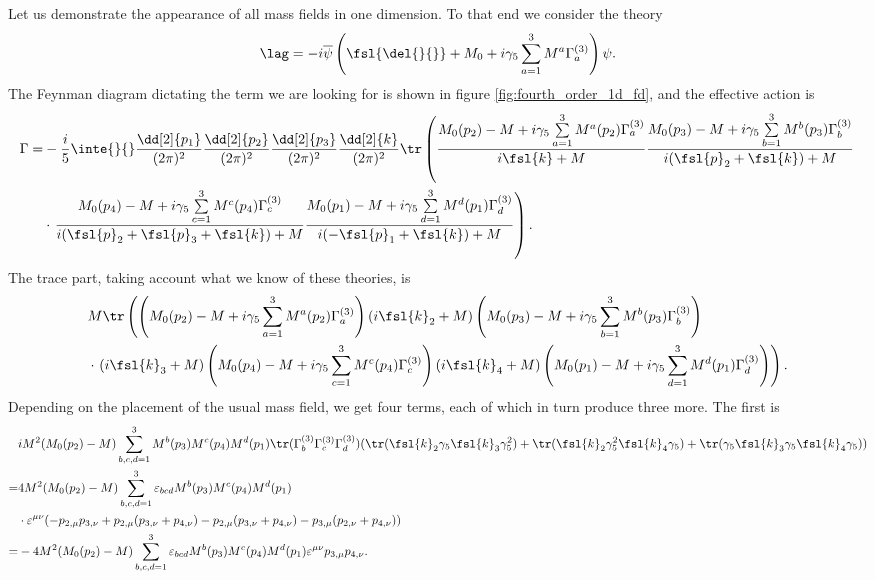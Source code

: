 Let us demonstrate the appearance of all mass fields in one dimension. To that end we consider the theory
\begin{align*}
	\lag = -i\overline{\psi}\left(\fsl{\del{}{}} + M_{0} + i\gamma_{5}\sum\limits_{a = 1}^{3}M^{a}\Gamma_{a}^{(3)}\right)\psi.
\end{align*}
The Feynman diagram dictating the term we are looking for is shown in figure \ref{fig:fourth_order_1d_fd}, and the effective action is
\begin{align*}
	\Gamma =& -\frac{i}{5}\inte{}{}\frac{\dd[2]{p_{1}}}{(2\pi)^{2}}\frac{\dd[2]{p_{2}}}{(2\pi)^{2}}\frac{\dd[2]{p_{3}}}{(2\pi)^{2}}\frac{\dd[2]{k}}{(2\pi)^{2}}\tr\left(\frac{M_{0}(p_{2}) - M + i\gamma_{5}\sum\limits_{a = 1}^{3}M^{a}(p_{2})\Gamma_{a}^{(3)}}{i\fsl{k} + M}\frac{M_{0}(p_{3}) - M + i\gamma_{5}\sum\limits_{b = 1}^{3}M^{b}(p_{3})\Gamma_{b}^{(3)}}{i(\fsl{p}_{2} + \fsl{k}) + M} \right. \\
	        &\cdot \left. \frac{M_{0}(p_{4}) - M + i\gamma_{5}\sum\limits_{c = 1}^{3}M^{c}(p_{4})\Gamma_{c}^{(3)}}{i(\fsl{p}_{2} + \fsl{p}_{3} + \fsl{k}) + M}\frac{M_{0}(p_{1}) - M + i\gamma_{5}\sum\limits_{d = 1}^{3}M^{d}(p_{1})\Gamma_{d}^{(3)}}{i(-\fsl{p}_{1} + \fsl{k}) + M}\right).
\end{align*}
The trace part, taking account what we know of these theories, is
\begin{align*}
	&M\tr\left(\left(M_{0}(p_{2}) - M + i\gamma_{5}\sum\limits_{a = 1}^{3}M^{a}(p_{2})\Gamma_{a}^{(3)}\right)(i\fsl{k}_{2} + M)\left(M_{0}(p_{3}) - M + i\gamma_{5}\sum\limits_{b = 1}^{3}M^{b}(p_{3})\Gamma_{b}^{(3)}\right) \right. \\
	&\cdot \left. (i\fsl{k}_{3} + M)\left(M_{0}(p_{4}) - M + i\gamma_{5}\sum\limits_{c = 1}^{3}M^{c}(p_{4})\Gamma_{c}^{(3)}\right)(i\fsl{k}_{4} + M)\left(M_{0}(p_{1}) - M + i\gamma_{5}\sum\limits_{d = 1}^{3}M^{d}(p_{1})\Gamma_{d}^{(3)}\right)\right).
\end{align*}
Depending on the placement of the usual mass field, we get four terms, each of which in turn produce three more. The first is
\begin{align*}
	 &iM^{2}(M_{0}(p_{2}) - M)\sum\limits_{b, c, d = 1}^{3}M^{b}(p_{3})M^{c}(p_{4})M^{d}(p_{1})\tr(\Gamma_{b}^{(3)}\Gamma_{c}^{(3)}\Gamma_{d}^{(3)})(\tr(\fsl{k}_{2}\gamma_{5}\fsl{k}_{3}\gamma_{5}^{2}) + \tr(\fsl{k}_{2}\gamma_{5}^{2}\fsl{k}_{4}\gamma_{5}) + \tr(\gamma_{5}\fsl{k}_{3}\gamma_{5}\fsl{k}_{4}\gamma_{5})) \\
	=& 4M^{2}(M_{0}(p_{2}) - M)\sum\limits_{b, c, d = 1}^{3}\varepsilon_{bcd}M^{b}(p_{3})M^{c}(p_{4})M^{d}(p_{1}) \\
	 &\cdot\varepsilon^{\mu\nu}(-p_{2, \mu}p_{3, \nu} + p_{2, \mu}(p_{3, \nu} + p_{4, \nu}) - p_{2, \mu}(p_{3, \nu} + p_{4, \nu}) - p_{3, \mu}(p_{2, \nu} + p_{4, \nu})) \\
	=& -4M^{2}(M_{0}(p_{2}) - M)\sum\limits_{b, c, d = 1}^{3}\varepsilon_{bcd}M^{b}(p_{3})M^{c}(p_{4})M^{d}(p_{1})\varepsilon^{\mu\nu}p_{3, \mu}p_{4, \nu}.
\end{align*}
